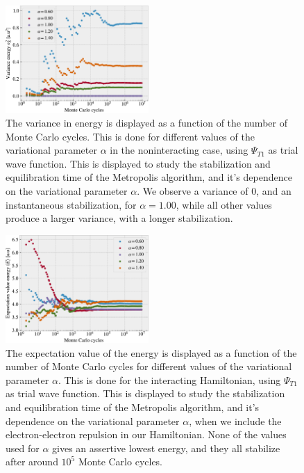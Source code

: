 \documentclass[%
 reprint,
nofootinbib,
aps,
]{revtex4-1}
\begin{document}
\begin{figure}
  \centering
  \includegraphics[width=0.485\textwidth]{../figures/stability_variance_E0.pdf}
  \caption{The variance in energy is displayed as a function of the number of Monte Carlo cycles. This is done for different values of the variational parameter $\alpha$ in the noninteracting case, using $\Psi_{T1}$ as trial wave function. This is displayed to study the stabilization and equilibration time of the Metropolis algorithm, and it's dependence on the variational parameter $\alpha$. We observe a variance of $0$, and an instantaneous stabilization, for $\alpha=1.00$, while all other values produce a larger variance, with a longer stabilization.}
  \label{fig:stability_variance_E0}
\end{figure}

\begin{figure}
  \centering
  \includegraphics[width=0.485\textwidth]{../figures/stability_energy_E1.pdf}
  \caption{The expectation value of the energy is displayed as a function of the number of Monte Carlo cycles for different values of the variational parameter $\alpha$. This is done for the interacting Hamiltonian, using $\Psi_{T1}$ as trial wave function. This is displayed to study the stabilization and equilibration time of the Metropolis algorithm, and it's dependence on the variational parameter $\alpha$, when we include the electron-electron repulsion in our Hamiltonian. None of the values used for $\alpha$ gives an assertive lowest energy, and they all stabilize after around $10^5$ Monte Carlo cycles.}
  \label{fig:stability_energy_E1}
\end{figure}
\end{document}
